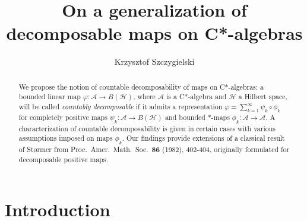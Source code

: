 \documentclass[reqno]{amsart}
\theoremstyle{plain}
\numberwithin{equation}{section}
\numberwithin{theorem}{section}
\numberwithin{lemma}{section}
\numberwithin{definition}{section}
\numberwithin{corollary}{section}
\numberwithin{remark}{section}
\newcommand{\hilbert}{\mathcal{H}}
\begin{document}
\title[On a generalization of decomposable maps on C*-algebras]{On a generalization of decomposable maps on C*-algebras}
\author{Krzysztof Szczygielski}
\address{Institute of Theoretical Physics and Astrophysics, Faculty of Mathematics, Physics and Informatics, University of Gda\'nsk, Wita Stwosza 57, 80-308 Gda\'nsk, Poland}

\begin{abstract}
We propose the notion of countable decomposability of maps on C*-algebras: a bounded linear map $\varphi : \mathscr{A}\to B(\hilbert)$, where $\mathscr{A}$ is a C*-algebra and $\hilbert$ a Hilbert space, will be called \emph{countably decomposable} if it admits a representation $\varphi = \sum_{k=1}^{\infty} \psi_k \circ \phi_k$ for completely positive maps $\psi_k : \mathscr{A}\to B(\hilbert)$ and bounded *-maps $\phi_k : \mathscr{A}\to\mathscr{A}$. A characterization of countable decomposability is given in certain cases with various assumptions imposed on maps $\phi_k$. Our findings provide extensions of a classical result of Størmer from Proc.~Amer.~Math.~Soc.~\textbf{86} (1982), 402-404, originally formulated for decomposable positive maps.
\end{abstract}

\maketitle

\section{Introduction}
\end{document}
